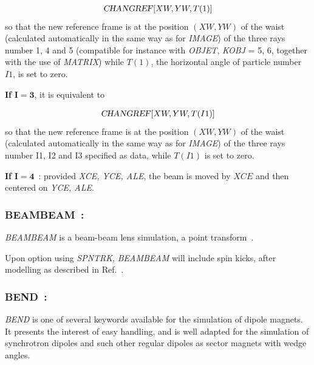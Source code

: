 $$ \text{\textsl{CHANGREF}} \lbrack XW, YW, T(1)\rbrack $$
%
 so that the new reference frame is at the position $ (XW, YW) $ of
the waist (calculated automatically in the same way as for 
\textsl{IMAGE}) of the three rays number 1, 4 and 5 (compatible for instance
with \textsl{OBJET}, \textsl{KOBJ}  =  5, 6,  together with the 
use of \textsl{MATRIX}) while $T(1)$, the horizontal angle of particle number $I1$,  is set to zero.  

\bigskip

\noindent\textbf{If} $\mathbf{I=3}$,  it is equivalent to 

$$\text{\textsl{CHANGREF}} \lbrack XW,YW,T(I1)\rbrack $$
%
 so that the new reference frame is at the position $ (XW, YW) $ of
the waist (calculated automatically in the same way as for 
\textsl{IMAGE}) of the three rays number I1, I2 and I3 specified as data,  while $T(I1)$ is set to zero.
 

\bigskip

\noindent\textbf{If} $\mathbf{I=4}$~: provided \textsl{XCE, YCE, ALE}, 
 the beam is moved by $XCE$ and then centered on \textsl{YCE, ALE}. 
 


\newpage


\subsubsection*{BEAMBEAM~: \BEAMBEAMTitl}\label{BEAMBEAM}  
  
\medskip

\textsl{BEAMBEAM} is a beam-beam lens simulation, a point transform~\cite{BBSW}. 

\medskip 

\noindent Upon option using \textsl{SPNTRK}, 
\textsl{BEAMBEAM} will include spin kicks, after  modelling as described in Ref.~\cite{YKBatyginSpin}. 



\newpage


\subsubsection*{BEND~: \BENDTitl}\label{BEND}  
\medskip

\textsl{BEND}  is one of  several keywords available for the
simulation of dipole magnets. It presents the interest of easy handling, and is well adapted for 
the simulation of synchrotron dipoles and such other regular dipoles as sector magnets with wedge 
angles. 

